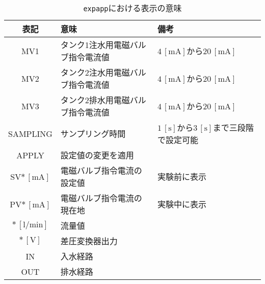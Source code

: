 \begin{table}[h]
  \begin{center}
    \caption{\texttt{expapp}における表示の意味}
    \begin{tabular}{c|l|l} \hline
      表記                      & 意味                              & 備考 \\ \hline
      MV1                       & タンク1注水用電磁バルブ指令電流値 & $4 \,\mathrm{[mA]}$から$20 \,\mathrm{[mA]}$ \\ \hline
      MV2                       & タンク2注水用電磁バルブ指令電流値 & $4 \,\mathrm{[mA]}$から$20 \,\mathrm{[mA]}$ \\ \hline
      MV3                       & タンク2排水用電磁バルブ指令電流値 & $4 \,\mathrm{[mA]}$から$20 \,\mathrm{[mA]}$ \\ \hline
      SAMPLING                  & サンプリング時間                  & $1 \,\mathrm{[s]}$から$3 \,\mathrm{[s]}$まで三段階で設定可能 \\ \hline
      APPLY                     & 設定値の変更を適用                & \\ \hline
      SV$\ast \,\mathrm{[mA]}$  & 電磁バルブ指令電流の設定値        & 実験前に表示 \\ \hline
      PV$\ast \,\mathrm{[mA]}$  & 電磁バルブ指令電流の現在地        & 実験中に表示 \\ \hline
      $\ast \,\mathrm{[l/min]}$ & 流量値                            & \\ \hline
      $\ast \,\mathrm{[V]}$     & 差圧変換器出力                    & \\ \hline
      IN                        & 入水経路                          & \\ \hline
      OUT                       & 排水経路                          & \\ \hline
    \end{tabular}
    \label{tab:display}
  \end{center}
\end{table}

